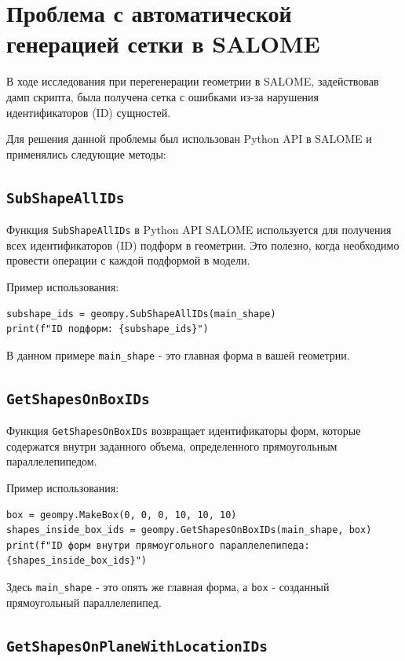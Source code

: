 \documentclass[a4paper,12pt]{article}
\theoremstyle{plain} %
\theoremstyle{definition} %
\theoremstyle{remark} %
\begin{document}
\section{Проблема с автоматической генерацией сетки в SALOME}

В ходе исследования при перегенерации геометрии в SALOME, задействовав дамп скрипта, была получена сетка с ошибками из-за нарушения идентификаторов (ID) сущностей.

Для решения данной проблемы был использован Python API в SALOME и применялись следующие методы:
\subsection{\texttt{SubShapeAllIDs}}

Функция \texttt{SubShapeAllIDs} в Python API SALOME используется для получения всех идентификаторов (ID) подформ в геометрии. Это полезно, когда необходимо провести операции с каждой подформой в модели.

Пример использования:
\begin{verbatim}
subshape_ids = geompy.SubShapeAllIDs(main_shape)
print(f"ID подформ: {subshape_ids}")
\end{verbatim}

В данном примере \texttt{main\_shape} - это главная форма в вашей геометрии.

\subsection{\texttt{GetShapesOnBoxIDs}}

Функция \texttt{GetShapesOnBoxIDs} возвращает идентификаторы форм, которые содержатся внутри заданного объема, определенного прямоугольным параллелепипедом.

Пример использования:
\begin{verbatim}
box = geompy.MakeBox(0, 0, 0, 10, 10, 10)
shapes_inside_box_ids = geompy.GetShapesOnBoxIDs(main_shape, box)
print(f"ID форм внутри прямоугольного параллелепипеда: {shapes_inside_box_ids}")
\end{verbatim}

Здесь \texttt{main\_shape} - это опять же главная форма, а \texttt{box} - созданный прямоугольный параллелепипед.

\subsection{\texttt{GetShapesOnPlaneWithLocationIDs}}
\end{document}
